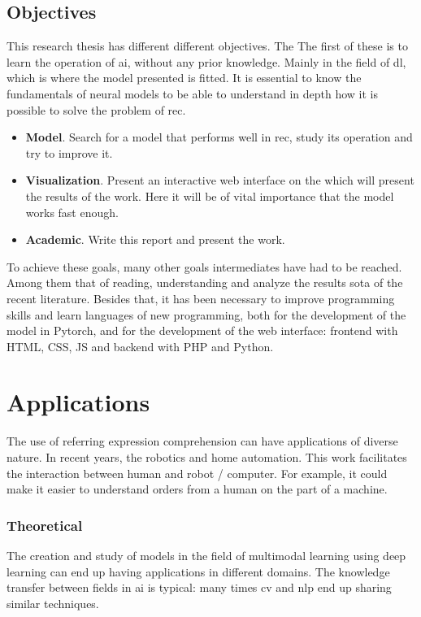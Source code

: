 \subsection{Objectives}

This research thesis has different different objectives. The
The first of these is to learn the operation of \gls{ai}, without any
prior knowledge. Mainly in the field of \gls{dl}, which is where the
model presented is fitted. It is essential to know the fundamentals of
neural models to be able to understand in depth how it is possible to solve
the problem of \gls{rec}.

\begin{itemize}
  \item \textbf{Model}. Search for a model that performs well in \gls{rec},
  study its operation and try to improve it.
  \item \textbf{Visualization}. Present an interactive web interface on the
  which will present the results of the work. Here it will be of vital importance
  that the model works fast enough.
  \item \textbf{Academic}. Write this report and present the work.
\end{itemize}

To achieve these goals, many other goals
intermediates have had to be reached. Among them that of reading, understanding and
analyze the results \gls{sota} of the recent literature. Besides that,
it has been necessary to improve programming skills and learn languages   of
new programming, both for the development of the model in Pytorch, and for
the development of the web interface: frontend with HTML, CSS, JS and backend with PHP
and Python.


\section{Applications} \label{sec:aplicaciones}

The use of referring expression comprehension can have applications of
diverse nature. In recent years, the
robotics and home automation. This work facilitates the interaction between human and
robot / computer. For example, it could make it easier to understand orders from a
human on the part of a machine.

\subsubsection{Theoretical}
The creation and study of models in the field of multimodal learning using
deep learning can end up having applications in different domains. The
knowledge transfer between fields in \gls{ai} is typical:
many times \gls{cv} and \gls{nlp} end up sharing similar techniques.


